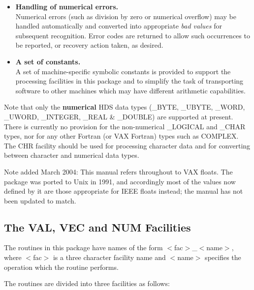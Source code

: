 \documentclass[11pt,nolof]{starlink}
\providecommand{\name}[1]{#1}
\begin{document}
\begin{itemize}
\item \textbf{Handling of numerical errors.}\\
Numerical errors (such as division by zero or numerical overflow) may be
handled automatically and converted into appropriate \emph{bad values} for
subsequent recognition.
Error codes are returned to allow such occurrences to be reported, or
recovery action taken, as desired.

\item \textbf{A set of constants.}\\
A set of machine-specific symbolic constants is provided to support the
processing facilities in this package and to simplify the task of
transporting software to other machines which may have different arithmetic
capabilities.

\end{itemize}

Note that only the \textbf{numerical} \name{HDS} data types (\name{\_BYTE},
\name{\_UBYTE}, \name{\_WORD}, \name{\_UWORD}, \name{\_INTEGER},
\name{\_REAL} \& \name{\_DOUBLE}) are supported at present.
There is currently no provision for the non-numerical \name{\_LOGICAL} and
\name{\_CHAR} types, nor for any other Fortran (or \name{VAX} Fortran) types
such as \name{COMPLEX}.
The \name{CHR} facility should be used for processing character data and for
converting between character and numerical data types.

Note added March 2004: This manual refers throughout to VAX floats.
The package was ported to Unix in 1991, and accordingly most of the
values now defined by it are those appropriate for IEEE floats
instead; the manual has not been updated to match.

\subsection{The \name{VAL}, \name{VEC} and \name{NUM} Facilities}

The routines in this package have names of the form
\mbox{$<$fac$>$\_$<$name$>$}, where \mbox{$<$fac$>$} is a three character
facility name and \mbox{$<$name$>$} specifies the operation which the
routine performs.

The routines are divided into three facilities as follows:
\end{document}
